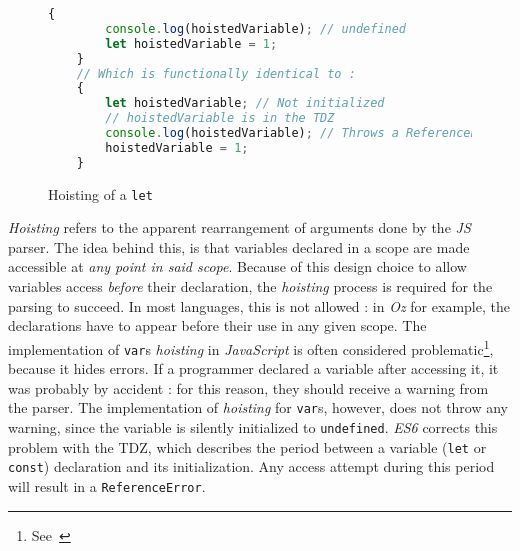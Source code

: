 \begin{itemize}
    \begin{figure}[H]
    \begin{lstlisting}[language=javaScript]
    {
        console.log(hoistedVariable); // undefined
        let hoistedVariable = 1;
    }
    // Which is functionally identical to :
    {
        let hoistedVariable; // Not initialized
        // hoistedVariable is in the TDZ
        console.log(hoistedVariable); // Throws a ReferenceError
        hoistedVariable = 1;
    }
    \end{lstlisting}
    \caption{Hoisting of a \texttt{let}}
    \label{fig:js-hoisting-2}
    \end{figure}
    \textit{Hoisting} refers to the apparent rearrangement of arguments done by the \textit{JS} parser.
    The idea behind this, is that variables declared in a scope are made accessible at \emph{any point in said scope}.
    Because of this design choice to allow variables access \emph{before} their declaration, the \textit{hoisting} process is required for the parsing to succeed.
    In most languages, this is not allowed : in \textit{Oz} for example, the declarations have to appear before their use in any given scope.
    The implementation of \texttt{var}s \textit{hoisting} in \textit{JavaScript} is often considered problematic\footnote{See~\cite{whyTDZ}}, because it hides errors.
    If a programmer declared a variable after accessing it, it was probably by accident : for this reason, they should receive a warning from the parser.
    The implementation of \textit{hoisting} for \texttt{var}s, however, does not throw any warning, since the variable is silently initialized to \texttt{undefined}.
    \textit{ES6} corrects this problem with the TDZ, which describes the period between a variable (\texttt{let} or \texttt{const}) declaration and its initialization.
    Any access attempt during this period will result in a \texttt{ReferenceError}.\newline


\end{itemize}
